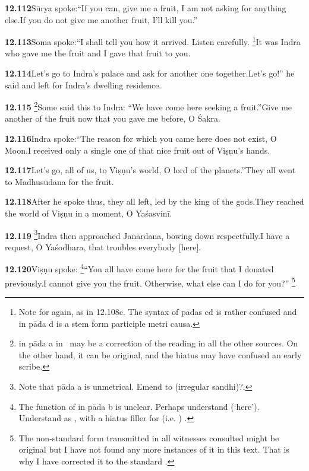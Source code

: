 \textbf{12.112}Sūrya spoke:``If you can, give me a fruit, I am not asking for anything else.If you do not give me another fruit, I'll kill you.''%


\textbf{12.113}Soma spoke:``I shall tell you how it arrived. Listen carefully.%
\footnote{Note  for  again, as in 12.108c.                The syntax of pādas cd is rather confused and  in pāda d               is a stem form participle metri causa.  }It was Indra who gave me the fruit and I gave that fruit to you.%


\textbf{12.114}Let's go to Indra's palace and ask for another one together.Let's go!'' he said and left for Indra's dwelling residence.%


\textbf{12.115}%
\footnote{ in pāda a in \msNc\ may be a correction of                 the reading in all the other sources. On the other hand,                 it can be original, and the hiatus may have confused an early scribe.  }Some said this to Indra: ``We have come here seeking a fruit.''Give me another of the fruit now that you gave me before, O Śakra.%


\textbf{12.116}Indra spoke:``The reason for which you came here does not exist, O Moon.I received only a single one of that nice fruit out of Viṣṇu's hands.%


\textbf{12.117}Let's go, all of us, to Viṣṇu's world, O lord of the planets.''They all went to Madhusūdana for the fruit.%


\textbf{12.118}After he spoke thus, they all left, led by the king of the gods.They reached the world of Viṣṇu in a moment, O Yaśasvinī.%


\textbf{12.119}%
\footnote{Note that pāda a is unmetrical. Emend to  (irregular sandhi)?.  }Indra then approached Janārdana, bowing down respectfully.I have a request, O Yaśodhara, that troubles everybody [here].%


\textbf{12.120}Viṣṇu spoke:%
\footnote{The function of  in pāda b is unclear. Perhaps understand  (`here').                 Understand  as , with a hiatus filler                  for  (i.e. ) .  }``You all have come here for the fruit that I donated previously.I cannot give you the fruit. Otherwise, what else can I do for you?''%
\footnote{The non-standard form  transmitted in all witnesses consulted                  might be original but I have not found any more instances of                  it in this text. That is why I have corrected it to the standard .  }%


